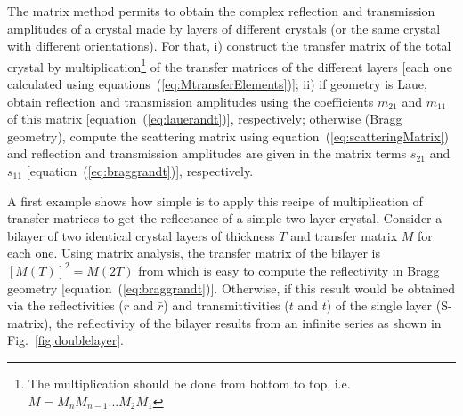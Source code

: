 \documentclass[preprint]{iucr}              %
\begin{document}
The matrix method permits to obtain the complex reflection and transmission amplitudes of a crystal made by layers of different crystals (or the same crystal with different orientations). For that,
i) construct the transfer matrix of the total crystal by multiplication\footnote{The multiplication should be done from bottom to top, i.e. $M=M_n M_{n-1}...M_2 M_1$}
of the transfer matrices of the different layers [each one calculated using equations~(\ref{eq:MtransferElements})];
ii) if geometry is Laue, obtain reflection and transmission amplitudes using the coefficients $m_{21}$ and $m_{11}$ of this matrix [equation~(\ref{eq:lauerandt})], respectively; otherwise (Bragg geometry), compute the scattering matrix using equation~(\ref{eq:scatteringMatrix}) and reflection and transmission amplitudes are given in the matrix terms $s_{21}$ and $s_{11}$ [equation~(\ref{eq:braggrandt})], respectively.

A first example shows how simple is to apply this recipe of multiplication of transfer matrices to get the reflectance of a simple two-layer crystal. Consider
a bilayer of two identical crystal layers of thickness $T$ and transfer matrix $M$ for each one. Using matrix analysis, the transfer matrix of the bilayer is $[M(T)]^2=M(2T)$ from which is easy to compute the reflectivity in Bragg geometry [equation~(\ref{eq:braggrandt})]. Otherwise, if this result would be obtained via the reflectivities ($r$ and $\bar{r}$) and transmittivities ($t$ and $\bar{t}$) of the single layer (S-matrix), the reflectivity of the bilayer results from an infinite series as shown in  Fig.~\ref{fig:doublelayer}.
 
\end{document}
